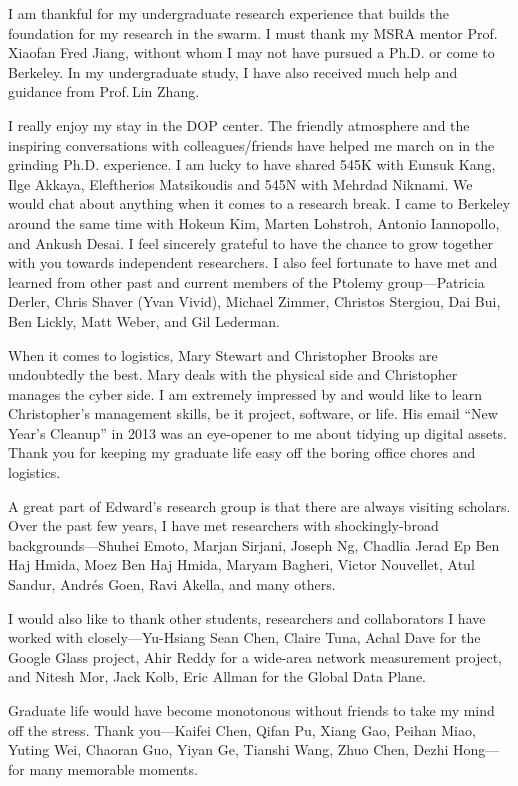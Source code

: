 \documentclass[thesis.tex]{subfiles}
\begin{document}
\begin{acknowledgements}
  I am thankful for my undergraduate research experience that builds the
  foundation for my research in the swarm. I must thank my MSRA mentor
  Prof.\,Xiaofan Fred Jiang, without whom I may not have pursued a Ph.D. or come
  to Berkeley. In my undergraduate study, I have also received much help and
  guidance from Prof.\,Lin Zhang.

  I really enjoy my stay in the DOP center. The friendly atmosphere and the
  inspiring conversations with colleagues/friends have helped me march on in the
  grinding Ph.D. experience. I am lucky to have shared 545K with Eunsuk Kang,
  Ilge Akkaya, Eleftherios Matsikoudis and 545N with Mehrdad Niknami. We would
  chat about anything when it comes to a research break. I came to Berkeley
  around the same time with Hokeun Kim, Marten Lohstroh, Antonio Iannopollo, and
  Ankush Desai. I feel sincerely grateful to have the chance to grow together
  with you towards independent researchers. I also feel fortunate to have met
  and learned from other past and current members of the Ptolemy
  group---Patricia Derler, Chris Shaver (Yvan Vivid), Michael Zimmer, Christos
  Stergiou, Dai Bui, Ben Lickly, Matt Weber, and Gil Lederman.

  When it comes to logistics, Mary Stewart and Christopher Brooks are
  undoubtedly the best. Mary deals with the physical side and Christopher
  manages the cyber side. I am extremely impressed by and would like to learn
  Christopher's management skills, be it project, software, or life. His email
  ``New Year's Cleanup'' in 2013 was an eye-opener to me about tidying up
  digital assets. Thank you for keeping my graduate life easy off the boring
  office chores and logistics.

  A great part of Edward's research group is that there are always visiting
  scholars. Over the past few years, I have met researchers with
  shockingly-broad backgrounds---Shuhei Emoto, Marjan Sirjani, Joseph Ng,
  Chadlia Jerad Ep Ben Haj Hmida, Moez Ben Haj Hmida, Maryam Bagheri, Victor
  Nouvellet, Atul Sandur, Andr\'es Goen, Ravi Akella, and many others.

  I would also like to thank other students, researchers and collaborators I
  have worked with closely---Yu-Hsiang Sean Chen, Claire Tuna, Achal Dave for
  the Google Glass project, Ahir Reddy for a wide-area network measurement
  project, and Nitesh Mor, Jack Kolb, Eric Allman for the Global Data Plane.

  Graduate life would have become monotonous without friends to take my mind off
  the stress. Thank you---Kaifei Chen, Qifan Pu, Xiang Gao, Peihan Miao, Yuting
  Wei, Chaoran Guo, Yiyan Ge, Tianshi Wang, Zhuo Chen, Dezhi Hong---for many
  memorable moments.


\end{acknowledgements}
\end{document}
